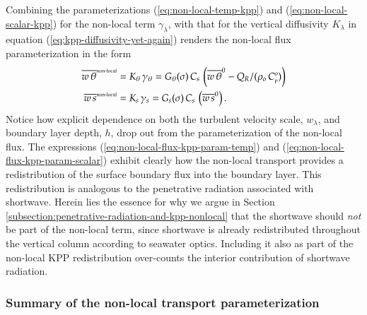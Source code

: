 \begin{itemize}
Combining the parameterizations (\ref{eq:non-local-temp-kpp}) and
(\ref{eq:non-local-scalar-kpp}) for the non-local term
$\gamma_{\lambda}$, with that for the vertical diffusivity
$K_{\lambda}$ in equation (\ref{eq:kpp-diffusivity-yet-again}) renders
the non-local flux parameterization in the form
\begin{align}
\overline{w \, \theta}^{\mbox{\tiny non-local}} &= K_{\theta}  \, \gamma_{\theta}
  = 
 G_{\theta}(\sigma) \, C_{s} \, \left( \overline{w \, \theta}^{0} - Q_{R}/(\rho_{o} \, C_{\mbox{\tiny p}}^{o}) \right)
\label{eq:non-local-flux-kpp-param-temp}
\\
\overline{w \, s}^{\mbox{\tiny non-local}} &= K_{s}  \, \gamma_{s}
  = 
 G_{s}(\sigma) \, C_{s}\,\left( \overline{w \, s}^{0} \right).
\label{eq:non-local-flux-kpp-param-scalar}
\end{align}
Notice how explicit dependence on both the turbulent velocity scale,
$w_{\lambda}$, and boundary layer depth, $h$, drop out from the
parameterization of the non-local flux.  The expressions
(\ref{eq:non-local-flux-kpp-param-temp}) and
(\ref{eq:non-local-flux-kpp-param-scalar}) exhibit clearly how the
non-local transport provides a redistribution of the surface boundary
flux into the boundary layer. This redistribution is analogous to the
penetrative radiation associated with shortwave.  Herein lies the
essence for why we argue in Section
\ref{subsection:penetrative-radiation-and-kpp-nonlocal} that the
shortwave should {\it not} be part of the non-local term, since
shortwave is already redistributed throughout the vertical column
according to seawater optics.  Including it also as part of the
non-local KPP redistribution over-counts the interior contribution of
shortwave radiation.

\end{itemize}


\subsubsection{Summary of the non-local transport parameterization} 

